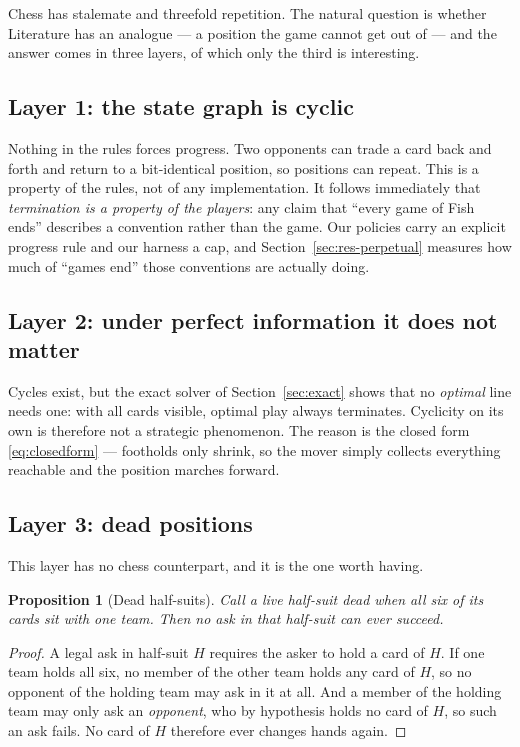 \documentclass[11pt,a4paper]{article}
\newtheorem{proposition}{Proposition}
\begin{document}
Chess has stalemate and threefold repetition. The natural question is whether
Literature has an analogue --- a position the game cannot get out of --- and the
answer comes in three layers, of which only the third is interesting.

\subsection{Layer 1: the state graph is cyclic}

Nothing in the rules forces progress. Two opponents can trade a card back and
forth and return to a bit-identical position, so positions can repeat. This is a
property of the rules, not of any implementation. It follows immediately that
\emph{termination is a property of the players}: any claim that ``every game of
Fish ends'' describes a convention rather than the game. Our policies carry an
explicit progress rule and our harness a cap, and Section~\ref{sec:res-perpetual}
measures how much of ``games end'' those conventions are actually doing.

\subsection{Layer 2: under perfect information it does not matter}

Cycles exist, but the exact solver of Section~\ref{sec:exact} shows that no
\emph{optimal} line needs one: with all cards visible, optimal play always
terminates. Cyclicity on its own is therefore not a strategic phenomenon. The
reason is the closed form \eqref{eq:closedform} --- footholds only shrink, so the
mover simply collects everything reachable and the position marches forward.

\subsection{Layer 3: dead positions}

This layer has no chess counterpart, and it is the one worth having.

\begin{proposition}[Dead half-suits]
\label{prop:dead}
Call a live half-suit \emph{dead} when all six of its cards sit with one team.
Then no ask in that half-suit can ever succeed.
\end{proposition}

\begin{proof}
A legal ask in half-suit $H$ requires the asker to hold a card of $H$. If one
team holds all six, no member of the other team holds any card of $H$, so no
opponent of the holding team may ask in it at all. And a member of the holding
team may only ask an \emph{opponent}, who by hypothesis holds no card of $H$, so
such an ask fails. No card of $H$ therefore ever changes hands again.
\end{proof}
\end{document}
